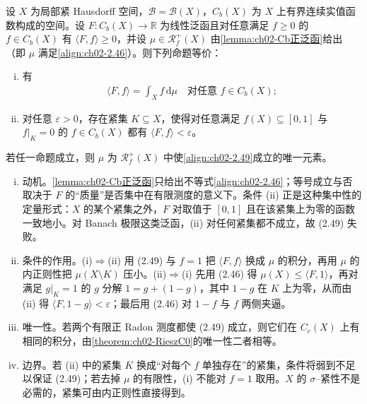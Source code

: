 \documentclass[../../main.tex]{subfiles}%
\begin{document}
\begin{proposition}\label{proposition:ch02-Cb表示}
设 $X$ 为局部紧 Hausdorff 空间，$\mathscr B=\mathscr B(X)$，$C_b(X)$ 为 $X$ 上有界连续实值函数构成的空间。设 $F:C_b(X)\to\mathbb R$ 为线性泛函且对任意满足 $f\geqslant0$ 的 $f\in C_b(X)$ 有 $\langle F,f\rangle\geqslant0$，并设 $\mu\in\mathscr R^+_f(X)$ 由\cref{lemma:ch02-Cb正泛函}给出（即 $\mu$ 满足\eqref{align:ch02-2.46}）。则下列命题等价：
\begin{enumerate}[(i)]
\item 有
\begin{align}
\langle F,f\rangle=\int_Xf\,\mathrm{d}\mu\quad\text{对任意 }f\in C_b(X); \label{align:ch02-2.49}
\end{align}
\item 对任意 $\varepsilon>0$，存在紧集 $K\subseteq X$，使得对任意满足 $f(X)\subseteq[0,1]$ 与 $f|_K=0$ 的 $f\in C_b(X)$ 都有 $\langle F,f\rangle<\varepsilon$。
\end{enumerate}
若任一命题成立，则 $\mu$ 为 $\mathscr R^+_f(X)$ 中使\eqref{align:ch02-2.49}成立的唯一元素。
\end{proposition}

\begin{remark}\label{remark:ch02-Cb表示动机}
\begin{enumerate}[(i)]
\item 动机。\cref{lemma:ch02-Cb正泛函}只给出不等式\eqref{align:ch02-2.46}；等号成立与否取决于 $F$ 的“质量”是否集中在有限测度的意义下。条件 (ii) 正是这种集中性的定量形式：$X$ 的某个紧集之外，$F$ 对取值于 $[0,1]$ 且在该紧集上为零的函数一致地小。对 Banach 极限这类泛函，(ii) 对任何紧集都不成立，故 (2.49) 失败。
\item 条件的作用。(i)$\Rightarrow$(ii) 用 (2.49) 与 $f=1$ 把 $\langle F,f\rangle$ 换成 $\mu$ 的积分，再用 $\mu$ 的内正则性把 $\mu(X\setminus K)$ 压小。(ii)$\Rightarrow$(i) 先用 (2.46) 得 $\mu(X)\leqslant\langle F,1\rangle$，再对满足 $g|_K=1$ 的 $g$ 分解 $1=g+(1-g)$，其中 $1-g$ 在 $K$ 上为零，从而由 (ii) 得 $\langle F,1-g\rangle<\varepsilon$；最后用 (2.46) 对 $1-f$ 与 $f$ 两侧夹逼。
\item 唯一性。若两个有限正 Radon 测度都使 (2.49) 成立，则它们在 $C_c(X)$ 上有相同的积分，由\cref{theorem:ch02-RieszC0}的唯一性二者相等。
\item 边界。若 (ii) 中的紧集 $K$ 换成“对每个 $f$ 单独存在”的紧集，条件将弱到不足以保证 (2.49)；若去掉 $\mu$ 的有限性，(i) 不能对 $f=1$ 取用。$X$ 的 $\sigma$--紧性不是必需的，紧集可由内正则性直接得到。
\end{enumerate}
\end{remark}
\end{document}
